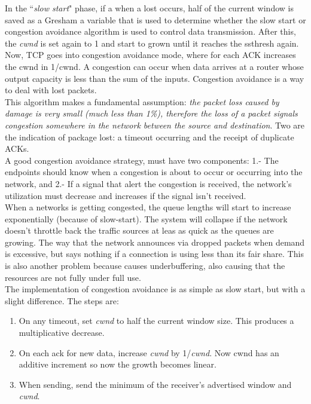 \indent In the ``\textit{slow start}" phase, if a when a lost occurs, half of the current window is saved as a Gresham a variable that is
 used to determine whether the slow start or congestion avoidance algorithm is used to control data transmission. After this, the \textit{cwnd} is set again to 1 and start to grown until it reaches the ssthresh again. Now, TCP goes into congestion avoidance mode, where for each ACK increases the cwnd in 1/cwnd. A congestion can occur when data arrives at a router whose output capacity is less than the sum of the inputs.  Congestion avoidance is a way to deal with lost packets.\\
	
This algorithm makes a fundamental assumption: \textit{the packet loss caused by damage is very small (much less than 1\%), therefore the loss of a packet signals congestion somewhere in the network between the source and destination}.  Two are the indication of package lost: a timeout occurring and the receipt of duplicate ACKs.\\

A good congestion avoidance strategy, must have two components: 1.- The endpoints should know when a congestion is about to occur or occurring into the network, and 2.- If a signal that alert the congestion is received, the network's utilization must decrease and increases if the signal isn't received.\\

When a networks is getting congested, the queue lengths will start to increase exponentially (because of slow-start). The system will collapse if the network doesn't throttle back the traffic sources at leas as quick as the queues are growing. The way that the network announces via dropped packets when demand is excessive, but says nothing if a connection is using less than its fair share. This is also another problem because causes underbuffering, also causing that the resources are not fully under full use.\\

The implementation of congestion avoidance is as simple as slow start, but with a slight difference\cite{Jacobson:1988:CAC:52325.52356}. The steps are:
\begin{enumerate}
\item On any timeout, set \textit{cwnd} to half the current window size. This produces a multiplicative decrease.
\item On each ack for new data, increase \textit{cwnd} by 1/\textit{cwnd}. Now cwnd has an additive increment so now the growth becomes linear.
\item When sending, send the minimum of the receiver's advertised window and \textit{cwnd}.
\end{enumerate}

